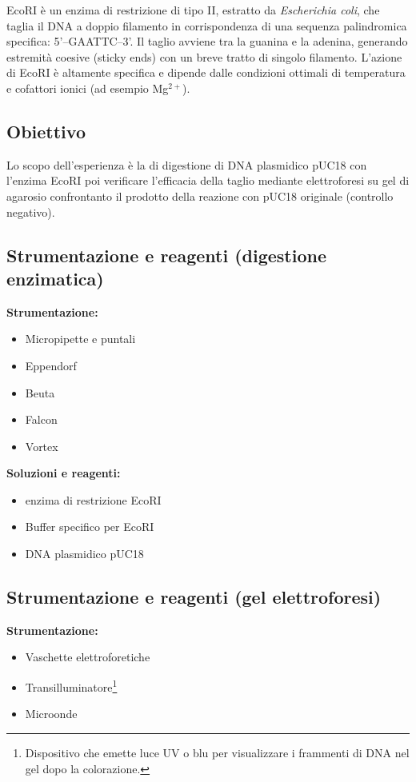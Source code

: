 EcoRI è un enzima di restrizione di tipo II, estratto da \textit{Escherichia coli}, che taglia il DNA a doppio filamento in corrispondenza di una sequenza palindromica specifica: 5'–GAATTC–3'. Il taglio avviene tra la guanina e la adenina, generando estremità coesive (sticky ends) con un breve tratto di singolo filamento. L’azione di EcoRI è altamente specifica e dipende dalle condizioni ottimali di temperatura e cofattori ionici (ad esempio Mg$^{2+}$).


\subsection{Obiettivo}
Lo scopo dell’esperienza è la di digestione di DNA plasmidico pUC18 con l’enzima EcoRI poi verificare l’efficacia della taglio mediante elettroforesi su gel di agarosio confrontanto il prodotto della reazione con pUC18 originale (controllo negativo).
\newpage

\subsection{Strumentazione e reagenti (digestione enzimatica)}

\textbf{Strumentazione:}
\begin{itemize}
  \item Micropipette e puntali
  \item Eppendorf
  \item Beuta
  \item Falcon
  \item Vortex
\end{itemize}

\textbf{Soluzioni e reagenti:}
\begin{itemize}
  \item enzima di restrizione EcoRI
  \item Buffer specifico per EcoRI
  \item DNA plasmidico pUC18
\end{itemize}

\subsection{Strumentazione e reagenti (gel elettroforesi)}

\textbf{Strumentazione:}
\begin{itemize}
  \item Vaschette elettroforetiche
  \item Transilluminatore\footnote{Dispositivo che emette luce UV o blu per visualizzare i frammenti di DNA nel gel dopo la colorazione.}
  \item Microonde
\end{itemize}

